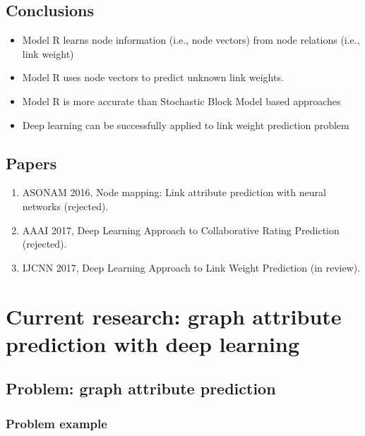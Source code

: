 \documentclass{article}
\begin{document}
\subsection{Conclusions}
\begin{itemize}
	\item Model R learns node information (i.e., node vectors) from node relations (i.e., link weight)
	\item Model R uses node vectors to predict unknown link weights.
	\item Model R is more accurate than Stochastic Block Model based approaches
	\item Deep learning can be successfully applied to link weight prediction problem
\end{itemize}
\subsection{Papers}
\begin{enumerate}
	\item ASONAM 2016, Node mapping: Link attribute prediction with neural networks (rejected).
	\item AAAI 2017, Deep Learning Approach to Collaborative Rating Prediction (rejected).
	\item IJCNN 2017, Deep Learning Approach to Link Weight Prediction (in review).
\end{enumerate}

\section{Current research: graph attribute prediction with deep learning}

\subsection{Problem: graph attribute prediction}

\subsubsection{Problem example}
\end{document}
